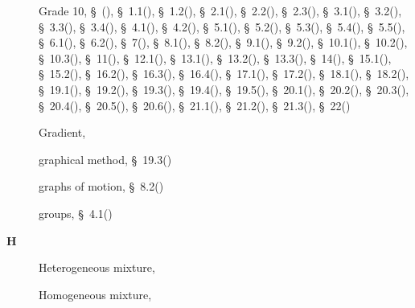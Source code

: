 \begin{multicols}{2}
{\begin{description}
	  \item[] \noindent\raggedright Grade 10,  \S~(\pageref{m30853}),  \S~1.1(\pageref{m38708}),  \S~1.2(\pageref{m38706}),  \S~2.1(\pageref{m38736}),  \S~2.2(\pageref{m38734}),  \S~2.3(\pageref{m38730}),  \S~3.1(\pageref{m38756}),  \S~3.2(\pageref{m38745}),  \S~3.3(\pageref{m38753}),  \S~3.4(\pageref{m38741}),  \S~4.1(\pageref{m38760}),  \S~4.2(\pageref{m38757}),  \S~5.1(\pageref{m38704}),  \S~5.2(\pageref{m38701}),  \S~5.3(\pageref{m38684}),  \S~5.4(\pageref{m38694}),  \S~5.5(\pageref{m38689}),  \S~6.1(\pageref{m38801}),  \S~6.2(\pageref{m38802}),  \S~7(\pageref{m38806}),  \S~8.1(\pageref{m38782}),  \S~8.2(\pageref{m38783}),  \S~9.1(\pageref{m38799}),  \S~9.2(\pageref{m38800}),  \S~10.1(\pageref{m38777}),  \S~10.2(\pageref{m38778}),  \S~10.3(\pageref{m38779}),  \S~11(\pageref{m38120}),  \S~12.1(\pageref{m38709}),  \S~13.1(\pageref{m38721}),  \S~13.2(\pageref{m38726}),  \S~13.3(\pageref{m38727}),  \S~14(\pageref{m37830}),  \S~15.1(\pageref{m38780}),  \S~15.2(\pageref{m38781}),  \S~16.2(\pageref{m38772}),  \S~16.3(\pageref{m38773}),  \S~16.4(\pageref{m38776}),  \S~17.1(\pageref{m38720}),  \S~17.2(\pageref{m38719}),  \S~18.1(\pageref{m38717}),  \S~18.2(\pageref{m38712}),  \S~19.1(\pageref{m38812}),  \S~19.2(\pageref{m38813}),  \S~19.3(\pageref{m38815}),  \S~19.4(\pageref{m38816}),  \S~19.5(\pageref{m38819}),  \S~20.1(\pageref{m38787}),  \S~20.2(\pageref{m38788}),  \S~20.3(\pageref{m38791}),  \S~20.4(\pageref{m38794}),  \S~20.5(\pageref{m38795}),  \S~20.6(\pageref{m38796}),  \S~21.1(\pageref{m38784}),  \S~21.2(\pageref{m38785}),  \S~21.3(\pageref{m38786}),  \S~22(\pageref{m38138})
	  
	  \item[] \noindent\raggedright Gradient,  \pageref{id2533985}
	  
	  \item[] \noindent\raggedright graphical method,  \S~19.3(\pageref{m38815})
	  
	  \item[] \noindent\raggedright graphs of motion,  \S~8.2(\pageref{m38783})
	  
	  \item[] \noindent\raggedright groups,  \S~4.1(\pageref{m38760})
	  \vspace{.3cm}
	  \item[{\large \bfseries H}]\noindent\raggedright
	  Heterogeneous mixture,  \pageref{id2405839}
	  
	  \item[] \noindent\raggedright Homogeneous mixture,  \pageref{id2405912}
	  

\end{description}}
\end{multicols}
